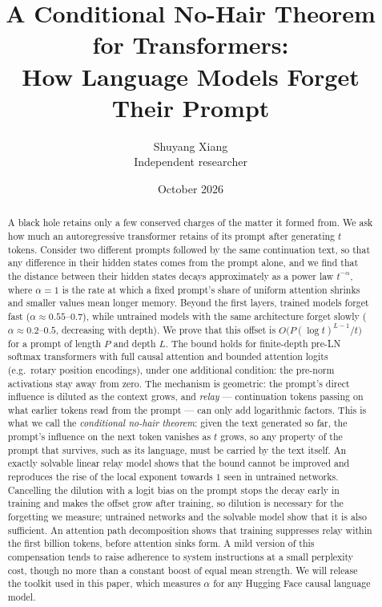 \documentclass[11pt]{article}
\title{A Conditional No-Hair Theorem for Transformers:\\ How Language Models Forget Their Prompt}
\author{Shuyang Xiang\\ Independent researcher}
\date{October 2026}
\theoremstyle{definition}
\theoremstyle{remark}
\begin{document}
\maketitle

\begin{abstract}
A black hole retains only a few conserved charges of the matter it formed from. We ask how much an autoregressive transformer retains of its prompt after generating $t$ tokens. Consider two different prompts followed by the same continuation text, so that any difference in their hidden states comes from the prompt alone, and we find that the distance between their hidden states decays approximately as a power law $t^{-\alpha}$, where $\alpha=1$ is the rate at which a fixed prompt's share of uniform attention shrinks and smaller values mean longer memory. Beyond the first layers, trained models forget fast ($\alpha\approx0.55$--$0.7$), while untrained models with the same architecture forget slowly ($\alpha\approx0.2$--$0.5$, decreasing with depth). We prove that this offset is $O\big(P(\log t)^{L-1}/t\big)$ for a prompt of length $P$ and depth $L$. The bound holds for finite-depth pre-LN softmax transformers with full causal attention and bounded attention logits (e.g.\ rotary position encodings), under one additional condition: the pre-norm activations stay away from zero. The mechanism is geometric: the prompt's direct influence is diluted as the context grows, and \emph{relay} --- continuation tokens passing on what earlier tokens read from the prompt --- can only add logarithmic factors. This is what we call the \emph{conditional no-hair theorem}: given the text generated so far, the prompt's influence on the next token vanishes as $t$ grows, so any property of the prompt that survives, such as its language, must be carried by the text itself. An exactly solvable linear relay model shows that the bound cannot be improved and reproduces the rise of the local exponent towards $1$ seen in untrained networks. Cancelling the dilution with a logit bias on the prompt stops the decay early in training and makes the offset grow after training, so dilution is necessary for the forgetting we measure; untrained networks and the solvable model show that it is also sufficient. An attention path decomposition shows that training suppresses relay within the first billion tokens, before attention sinks form. A mild version of this compensation tends to raise adherence to system instructions at a small perplexity cost, though no more than a constant boost of equal mean strength. We will release the toolkit used in this paper, which measures $\alpha$ for any Hugging Face causal language model.\end{abstract}
\end{document}
